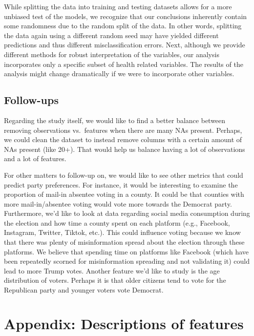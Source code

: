\documentclass[
]{article}
\begin{document}
While splitting the data into training and testing datasets allows for a more unbiased test of the models, we recognize that our conclusions inherently contain some randomness due to the random split of the data. In other words, splitting the data again using a different random seed may have yielded different predictions and thus different misclassification errors. Next, although we provide different methods for robust interpretation of the variables, our analysis incorporates only a specific subset of health related variables. The results of the analysis might change dramatically if we were to incorporate other variables.

\hypertarget{follow-ups}{%
\subsection{Follow-ups}\label{follow-ups}}

Regarding the study itself, we would like to find a better balance between removing observations vs.~features when there are many NAs present. Perhaps, we could clean the dataset to instead remove columns with a certain amount of NAs present (like 20+). That would help us balance having a lot of observations and a lot of features.

For other matters to follow-up on, we would like to see other metrics that could predict party preferences. For instance, it would be interesting to examine the proportion of mail-in absentee voting in a county. It could be that counties with more mail-in/absentee voting would vote more towards the Democrat party. Furthermore, we'd like to look at data regarding social media consumption during the election and how time a county spent on each platform (e.g., Facebook, Instagram, Twitter, Tiktok, etc.). This could influence voting because we know that there was plenty of misinformation spread about the election through these platforms. We believe that spending time on platforms like Facebook (which have been repeatedly scorned for misinformation spreading and not validating it) could lead to more Trump votes. Another feature we'd like to study is the age distribution of voters. Perhaps it is that older citizens tend to vote for the Republican party and younger voters vote Democrat.

\appendix

\hypertarget{appendix}{%
\section{Appendix: Descriptions of features}\label{appendix}}
\end{document}
